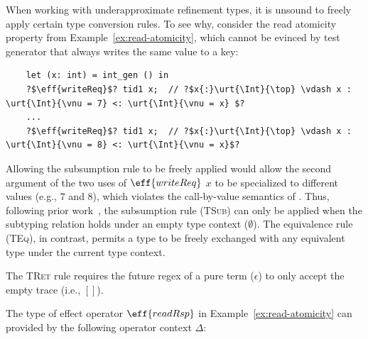 When working with underapproximate refinement types, it is unsound to
freely apply certain type conversion rules. To see why, consider the
read atomicity property from Example~\ref{ex:read-atomicity}, which
cannot be evinced by test generator that always writes the same value
to a key:
\begin{verbatim}
    let (x: int) = int_gen () in
    ?$\eff{writeReq}$? tid1 x;  // ?$x{:}\urt{\Int}{\top} \vdash x : \urt{\Int}{\vnu = 7} <: \urt{\Int}{\vnu = x} $?
    ...
    ?$\eff{writeReq}$? tid1 x;  // ?$x{:}\urt{\Int}{\top} \vdash x : \urt{\Int}{\vnu = 8} <: \urt{\Int}{\vnu = x}$?
\end{verbatim}
Allowing the subsumption rule to be freely applied would allow the
second argument of the two uses of $\eff{writeReq}$ $x$ to be
specialized to different values (e.g., $7$ and $8$), which violates
the call-by-value semantics of \DSL{}. Thus, following prior
work~\cite{CoverageType}, the subsumption rule (\textsc{TSub}) can
only be applied when the subtyping relation holds under an empty type
context ($\emptyset$). The equivalence rule (\textsc{TEq}), in
contrast, permits a type to be freely exchanged with any equivalent
type under the current type context.

The \textsc{TRet} rule requires the future regex of a pure term
($\epsilon$) to only accept the empty trace (i.e., $[]$).

\begin{example} The type of effect operator
  $\eff{readRsp}$ in Example~\ref{ex:read-atomicity} can provided by
  the following operator context $\Delta$: %
  \vspace{-.4cm} \par{}
\end{example}

